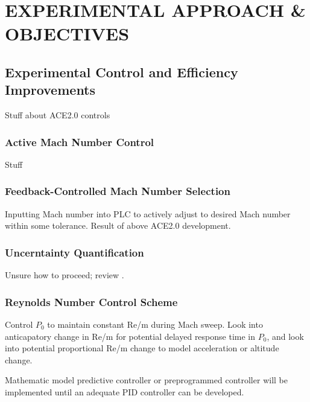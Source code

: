%
%  
%


\chapter{EXPERIMENTAL APPROACH \& OBJECTIVES}

\section{Experimental Control and Efficiency Improvements} 

Stuff about ACE2.0 controls

\subsection{Active Mach Number Control}

Stuff

\subsection{Feedback-Controlled Mach Number Selection}

Inputting Mach number into PLC to actively adjust to desired Mach number within some tolerance. Result of above ACE2.0 development.

\subsection{Uncerntainty Quantification}

Unsure how to proceed; review \cite{stephens-hubbard}.

\subsection{Reynolds Number Control Scheme}

Control $P_{0}$ to maintain constant Re/m during Mach sweep. Look into anticapatory change in Re/m for potential delayed response time in $P_{0}$, and look into potential proportional Re/m change to model acceleration or altitude change.

Mathematic model predictive controller or preprogrammed controller will be implemented until an adequate PID controller can be developed.

